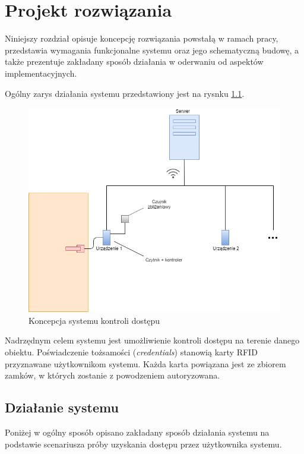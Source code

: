 \chapter{Projekt rozwiązania}
\label{chap:hl-arch}

        Niniejszy rozdział opisuje koncepcję rozwiązania powstałą w ramach pracy, przedstawia wymagania funkcjonalne systemu oraz jego schematyczną budowę, a także prezentuje zakładany sposób działania w oderwaniu od aspektów implementacyjnych.

        Ogólny zarys działania systemu przedstawiony jest na rysnku \ref{fig:door}.

        \begin{figure}[]
                \includegraphics[width=\linewidth]{chapters/images/door2.png}
                \caption{Koncepcja systemu kontroli dostępu}
                \label{fig:door}
        \end{figure}

        Nadrzędnym celem systemu jest umożliwienie kontroli dostępu na terenie danego obiektu. Poświadczenie tożsamości (\textit{credentials}) stanowią karty RFID przyznawane użytkownikom systemu. Każda karta powiązana jest ze zbiorem zamków, w których zostanie z powodzeniem autoryzowana.

        \section{Działanie systemu}
                Poniżej w ogólny sposób opisano zakładany sposób działania systemu na podstawie scenariusza próby uzyskania dostępu przez użytkownika systemu.

